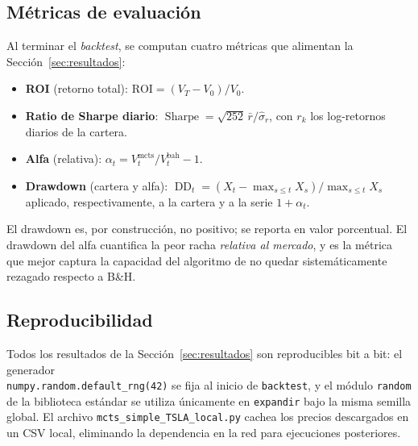 \subsection{Métricas de evaluación}
\label{subsec:metricas}

Al terminar el \emph{backtest}, se computan cuatro métricas que alimentan la Sección~\ref{sec:resultados}:

\begin{itemize}
    \item \textbf{ROI} (retorno total): $\text{ROI} = (V_T - V_0)/V_0$.
    \item \textbf{Ratio de Sharpe diario}: $\operatorname{Sharpe} = \sqrt{252}\,\bar r / \hat\sigma_r$, con $r_k$ los log-retornos diarios de la cartera.
    \item \textbf{Alfa} (relativa): $\alpha_t = V_t^{\text{mcts}} / V_t^{\text{bah}} - 1$.
    \item \textbf{Drawdown} (cartera y alfa): $\operatorname{DD}_t = (X_t - \max_{s \leq t} X_s)/\max_{s\leq t} X_s$ aplicado, respectivamente, a la cartera y a la serie $1 + \alpha_t$.
\end{itemize}

El drawdown es, por construcción, no positivo; se reporta en valor porcentual. El drawdown del alfa cuantifica la peor racha \emph{relativa al mercado}, y es la métrica que mejor captura la capacidad del algoritmo de no quedar sistemáticamente rezagado respecto a B\&H.

\subsection{Reproducibilidad}
\label{subsec:reproducibilidad}

Todos los resultados de la Sección~\ref{sec:resultados} son reproducibles bit a bit: el generador \\ \texttt{numpy.random.default\_rng(42)} se fija al inicio de \texttt{backtest}, y el módulo \texttt{random} de la biblioteca estándar se utiliza únicamente en \texttt{expandir} bajo la misma semilla global. El archivo \texttt{mcts\_simple\_TSLA\_local.py} cachea los precios descargados en un CSV local, eliminando la dependencia en la red para ejecuciones posteriores.
